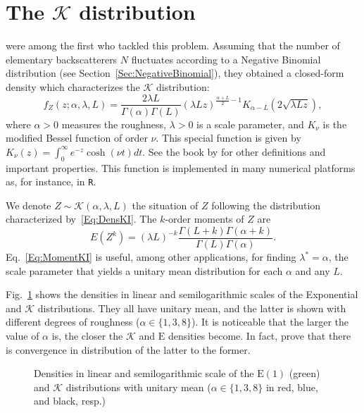\section{The $\mathcal K$ distribution}

\citet{JakemanPusey76} were among the first who tackled this problem.
Assuming that the number of elementary backscatterers $N$ fluctuates according to a Negative Binomial distribution (see Section~\ref{Sec:NegativeBinomial}), they obtained a closed-form density which characterizes the $\mathcal K$ distribution:
\begin{equation}
f_Z(z;\alpha,\lambda,L) =
\frac{2\lambda L}{\Gamma(\alpha)\Gamma(L)} (\lambda L z)^{\frac{\alpha+L}{2}-1} K_{\alpha-L}(2\sqrt{\lambda L z}),
\label{Eq:DensKI}
\end{equation}
where $\alpha>0$ measures the roughness, $\lambda>0$ is a scale parameter, and $K_\nu$ is the modified Bessel function of order $\nu$.
This special function is given by $K_\nu (z) = \int_0^\infty e^{-z} \cosh (\nu t) dt$.
See the book by \citet{Gradshteyn80} for other definitions and important properties.
This function is implemented in many numerical platforms as, for instance, in \texttt R.

We denote $Z\sim \mathcal K(\alpha,\lambda,L)$ the situation of $Z$ following the distribution characterized by~\eqref{Eq:DensKI}.
The $k$-order moments of $Z$ are
\begin{equation}
E(Z^k) = (\lambda L)^{-k} \frac{\Gamma(L+k)\Gamma(\alpha+k)}{\Gamma(L)\Gamma(\alpha)}.
\label{Eq:MomentKI}
\end{equation}
Eq.~\eqref{Eq:MomentKI} is useful, among other applications, for finding $\lambda^*=\alpha$, the scale parameter that yields a unitary mean distribution for each $\alpha$ and any $L$.

Fig.~\ref{Fig:KIDistribution} shows the densities in linear and semilogarithmic scales of the Exponential and $\mathcal K$ distributions.
They all have unitary mean, and the latter is shown with different degrees of roughness ($\alpha\in\{1,3,8\}$).
It is noticeable that the larger the value of $\alpha$ is, the closer the $\mathcal K$ and $\text{E}$ densities become.
In fact, \citet{frery96} prove that there is convergence in distribution of the latter to the former.

\begin{figure}[hbt]
\centering
{}
\caption[Densities in linear and semilogarithmic scale of the $\text{E}(1)$ (green) and $\mathcal K$ distributions]{Densities in linear and semilogarithmic scale of the $\text{E}(1)$ (green) and $\mathcal K$ distributions with unitary mean ($\alpha\in\{1,3,8\}$ in red, blue, and black, resp.)}\label{Fig:KIDistribution}
\end{figure}

